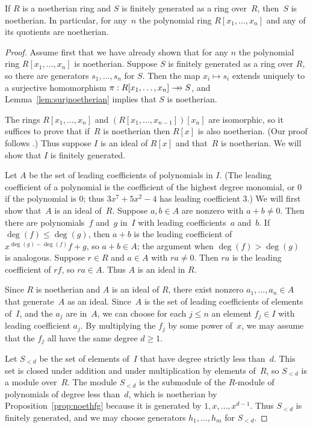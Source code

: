 \begin{theorem}
	\label{thm:hilbert}
	If $R$ is a noetherian ring and $S$ is finitely generated as a ring
	over~$R$, then~$S$ is noetherian.  In particular, for any~$n$ the
	polynomial ring $R[x_1,\ldots, x_n]$ and any of its quotients are
	noetherian.
\end{theorem}
\begin{proof}
Assume first that we have already shown that for any $n$ the
polynomial ring $R[x_1,\ldots, x_n]$ is noetherian.  Suppose $S$ is
finitely generated as a ring over $R$, so there are generators
$s_1,\ldots, s_n$ for $S$.  Then the map $x_i\mapsto s_i$ extends
uniquely to a surjective homomorphism $\pi: R[x_1,\ldots, x_n] \rightarrow\!\!\!\!\rightarrow S$,
and Lemma~\ref{lem:surjnoetherian} implies that $S$ is noetherian.

The rings $R[x_1,\ldots, x_n]$ and $(R[x_1,\ldots,x_{n-1}])[x_n]$ are
isomorphic, so it suffices to prove that if~$R$ is noetherian then
$R[x]$ is also noetherian.  (Our proof follows
\cite[\S12.5]{artin:algebra}.)
Thus suppose $I$ is an ideal of $R[x]$ and that~$R$ is
noetherian.  We will show that $I$ is finitely generated.

Let $A$ be the set of leading coefficients of polynomials in $I$.
(The leading coefficient of a polynomial is the coefficient of
the highest degree monomial, or $0$ if the polynomial is $0$; thus
$3x^7 + 5x^2  - 4$ has leading coefficient $3$.)
We will first show that~$A$ is an ideal of~$R$.
Suppose $a,b\in A$ are nonzero with $a+b\neq 0$.  Then there are
polynomials~$f$ and~$g$ in~$I$ with leading coefficients~$a$ and~$b$.
If $\deg(f)\leq \deg(g)$, then $a+b$ is the leading coefficient of
$x^{\deg(g)-\deg(f)}f + g$, so $a+b\in A$; the argument when
$\deg(f)> \deg(g)$ is analogous.  Suppose $r\in R$ and $a\in A$
with $ra\neq 0$. Then $ra$ is the leading coefficient of $rf$, so
$ra\in A$.  Thus $A$ is an ideal in $R$.

Since $R$ is noetherian and $A$ is an ideal of $R$, there exist nonzero
$a_1,\ldots, a_n\in A$ that generate~$A$ as an ideal.  Since~$A$ is the set
of leading coefficients of elements of~$I$, and the $a_j$ are in~$A$,
we can choose for each $j\leq n$ an element $f_j\in I$ with leading
coefficient $a_j$.  By multiplying the $f_j$ by some power of~$x$, we
may assume that the $f_j$ all have the same degree $d\geq 1$.

Let $S_{<d}$ be the set of elements of~$I$ that have degree strictly
less than~$d$.  This set is closed under addition and under
multiplication by elements of~$R$, so $S_{<d}$ is a module over~$R$.
The module $S_{<d}$ is the submodule of the $R$-module of polynomials
of degree less than~$d$, which is noetherian by
Proposition~\ref{prop:noethfg} because it is generated by $1,x,\ldots,
x^{d-1}$.  Thus $S_{<d}$ is finitely generated, and we may choose
generators $h_1,\ldots, h_m$ for $S_{<d}$.


\end{proof}
